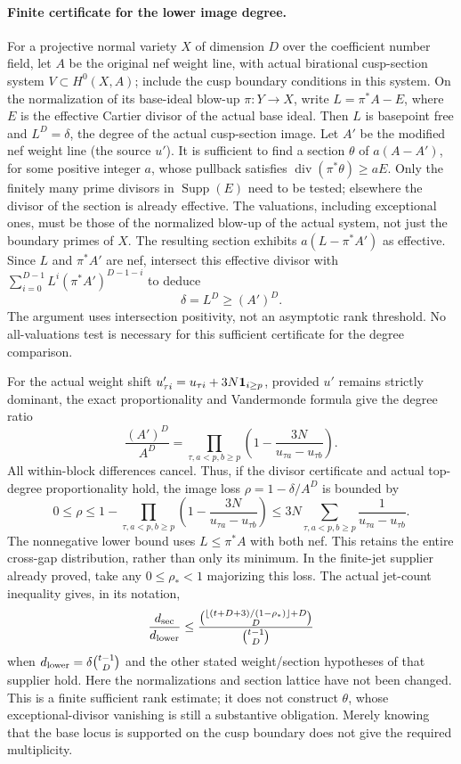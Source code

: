 \paragraph{Finite certificate for the lower image degree.}
For a projective normal variety \(X\) of dimension \(D\)
over the coefficient number field, let \(A\) be the original nef
weight line, with actual birational cusp-section system
\(V\subset H^0(X,A)\); include the cusp boundary conditions
in this system. On the normalization of its base-ideal blow-up
\(\pi:Y\to X\), write \(L=\pi^*A-E\), where \(E\) is the
effective Cartier divisor of the actual base ideal.
Then \(L\) is basepoint free and \(L^D=\delta\), the degree
of the actual cusp-section image. Let \(A'\) be the modified
nef weight line (the source \(u'\)).
It is sufficient to find a section \(\theta\) of
\(a(A-A')\), for some positive integer \(a\), whose pullback
satisfies \(\operatorname{div}(\pi^*\theta)\ge aE\).
Only the finitely many prime divisors in \(\operatorname{Supp}(E)\)
need to be tested; elsewhere the divisor of the section is
already effective. The valuations, including exceptional ones,
must be those of the normalized blow-up of the actual system,
not just the boundary primes of \(X\).
The resulting section exhibits \(a(L-\pi^*A')\) as effective.
Since \(L\) and \(\pi^*A'\) are nef, intersect this effective
divisor with
\(\sum_{i=0}^{D-1}L^i(\pi^*A')^{D-1-i}\) to deduce
\[
 \delta=L^D\ge(A')^D .
 \tag{FW1}
\]
The argument uses intersection positivity, not an asymptotic
rank threshold. No all-valuations test is necessary for this
sufficient certificate for the degree comparison.

For the actual weight shift \(u'_{\tau i}=u_{\tau i}
+3N{\bf1}_{i\ge p}\), provided \(u'\) remains strictly
dominant, the exact proportionality and Vandermonde formula
give the degree ratio
\[
 \frac{(A')^D}{A^D}
  =\prod_{\tau,a<p,b\ge p}\left(1-\frac{3N}{u_{\tau a}-u_{\tau b}}\right).
 \tag{FW2}
\]
All within-block differences cancel. Thus, if the divisor
certificate and actual top-degree proportionality hold,
the image loss \(\rho=1-\delta/A^D\) is bounded by
\[
 0\le\rho\le1-\prod_{\tau,a<p,b\ge p}
 \left(1-\frac{3N}{u_{\tau a}-u_{\tau b}}\right)
 \le 3N\sum_{\tau,a<p,b\ge p}\frac1{u_{\tau a}-u_{\tau b}}.
\]
The nonnegative lower bound uses \(L\le\pi^*A\) with both nef.
This retains the entire cross-gap distribution, rather than
only its minimum. In the finite-jet supplier already proved,
take any \(0\le\rho_*<1\) majorizing this loss. The actual
jet-count inequality gives, in its notation,
\[
 \frac{d_{\rm sec}}{d_{\rm lower}}\le
 \frac{\binom{\lfloor(t+D+3)/(1-\rho_*)\rfloor+D}{D}}
      {\binom{t-1}{D}}
\]
when \(d_{\rm lower}=\delta\binom{t-1}{D}\) and the other
stated weight/section hypotheses of that supplier hold.
Here the normalizations and section lattice have not been
changed. This is a finite sufficient rank estimate; it does
not construct \(\theta\), whose exceptional-divisor
vanishing is still a substantive obligation. Merely knowing
that the base locus is supported on the cusp boundary
does not give the required multiplicity.
